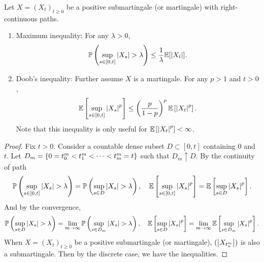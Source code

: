 \begin{thm}
    Let $X=(X_t)_{t \geq 0}$ be a positive submartingale (or martingale) with right-continuous paths.
    \begin{enumerate}[label=(\arabic{*})]
        \item Maximum inequality: For any $\lambda > 0$,
        \begin{equation*}
            \mathbb{P}\left(\sup_{s \in [0,t]} \left\lvert X_s\right\lvert > \lambda\right) \leq \frac{1}{\lambda} \mathbb{E}[\left\lvert X_t\right\lvert].
        \end{equation*}

        \item Doob's inequality: Further assume $X$ is a martingale. For any $p > 1$ and $t > 0$,
        \begin{equation*}
            \mathbb{E}\left[\sup_{s \in [0,t]} \left\lvert X_s\right\lvert^p\right] \leq \left(\frac{p}{1 - p}\right)^p \mathbb{E}\left[\left\lvert X_t\right\lvert^p\right].
        \end{equation*}
        Note that this inequality is only useful for $\mathbb{E}\left[\left\lvert X_t\right\lvert^p\right] < \infty$.
    \end{enumerate}
\end{thm}
\begin{proof}
    Fix $t > 0$. Consider a countable dense subset $D \subset [0,t]$ containing $0$ and $t$. Let $D_m = \left\{0 = t_0^m < t_1^m < \cdots < t^m_m = t\right\}$ such that $D_m \uparrow D$. By the continuity of path
    \begin{equation*}
        \mathbb{P}\left(\sup_{s \in [0,t]} \left\lvert X_s\right\lvert > \lambda\right) = \mathbb{P}\left(\sup_{s \in D} \left\lvert X_s\right\lvert > \lambda\right),\quad \mathbb{E}\left[\sup_{s \in [0,t]} \left\lvert X_s\right\lvert^p\right] = \mathbb{E}\left[\sup_{s \in D} \left\lvert X_s\right\lvert^p\right].
    \end{equation*}
    And by the convergence,
    \begin{equation*}
        \mathbb{P}\left(\sup_{s \in D} \left\lvert X_s\right\lvert > \lambda\right) = \lim_{m \rightarrow \infty } \mathbb{P}\left(\sup_{s \in D_m} \left\lvert X_s\right\lvert > \lambda\right),\quad  \mathbb{E}\left[\sup_{s \in D} \left\lvert X_s\right\lvert^p\right] = \lim_{m \rightarrow \infty } \mathbb{E}\left[\sup_{s \in D_m} \left\lvert X_s\right\lvert^p\right].
    \end{equation*}
    When $X=(X_t)_{t \geq 0}$ be a positive submartingale (or martingale), $(\left\lvert X_{t_n^m}\right\lvert)$ is also a submartingale. Then by the discrete case, we have the inequalities.
\end{proof}
